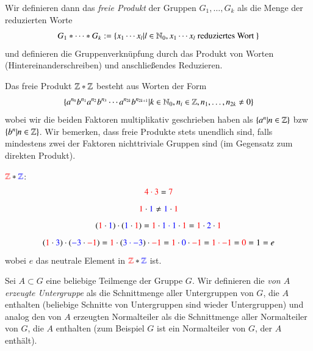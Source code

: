 \documentclass[a4paper,10pt]{scrartcl}
\begin{document}
Wir definieren dann das \emph{freie Produkt} der Gruppen $G_1, \dotsc  ,G_k$ als die Menge der reduzierten Worte
\[
 G_1*\dotsm *G_k:=\{x_1 \dotsb x_l|l\in \mathbb{N}_0, x_1 \dotsb x_l \text{ reduziertes Wort } \}
\]
und definieren die Gruppenverknüpfung durch das Produkt von Worten (Hintereinanderschreiben) und anschließendes Reduzieren.
\begin{ex*}
 Das freie Produkt $\mathbb{Z}*\mathbb{Z}$ besteht aus Worten der Form
\[
 \{a^{n_0} b^{n_1} a^{n_2} b^{n_3} \dotsb a^{n_{2k}}b^{n_{2k+1}}|k\in \mathbb{N}_0, n_i \in \mathbb{Z}, n_1,\dotsc, n_{2k}\neq 0\}
\]
wobei wir die beiden Faktoren multiplikativ geschrieben haben als $\{a^n|n\in \mathbb{Z}\}$ bzw $\{b^n|n\in \mathbb{Z}\}$. Wir bemerken, dass freie Produkte stets unendlich sind, falls mindestens zwei der Faktoren nichttriviale Gruppen sind (im Gegensatz zum direkten Produkt).

\end{ex*}
\begin{note*}
 $\textcolor{red}{\mathbb{Z}}*\textcolor{blue}{\mathbb{Z}}$: 
\[
 \textcolor{red}{4\cdot 3} =  \textcolor{red}{7}
\]
\[
 \textcolor{red}{1}\cdot \textcolor{blue}{1} \neq \textcolor{blue}{1}\cdot \textcolor{red}{1}
\]
\[
  (\textcolor{red}{1}\cdot \textcolor{blue}{1}) \cdot (\textcolor{blue}{1}\cdot \textcolor{red}{1})  = \textcolor{red}{1}\cdot \textcolor{blue}{1 \cdot 1} \cdot \textcolor{red}{1} = \textcolor{red}{1}\cdot \textcolor{blue}{2}\cdot \textcolor{red}{1}
\]
\[
 (\textcolor{red}{1}\cdot \textcolor{blue}{3}) \cdot (\textcolor{blue}{-3}\cdot \textcolor{red}{-1})  = \textcolor{red}{1}\cdot (\textcolor{blue}{3 \cdot -3}) \cdot \textcolor{red}{-1} = \textcolor{red}{1}\cdot \textcolor{blue}{0}\cdot \textcolor{red}{-1} = \textcolor{red}{1 \cdot -1} = \textcolor{red}{0} = 1 = e
\]
wobei $e$ das neutrale Element in  $\textcolor{red}{\mathbb{Z}}*\textcolor{blue}{\mathbb{Z}}$ ist.
\end{note*}

Sei $A\subset G$ eine beliebige Teilmenge der Gruppe $G$. Wir definieren die \emph{von $A$ erzeugte Untergruppe} als die Schnittmenge aller Untergruppen von $G$, die $A$ enthalten (beliebige Schnitte von Untergruppen sind wieder Untergruppen) und analog den von $A$ erzeugten Normalteiler als die Schnittmenge aller Normalteiler von $G$, die $A$ enthalten (zum Beispiel $G$ ist ein Normalteiler von $G$, der $A$ enthält).
 
\end{document}
